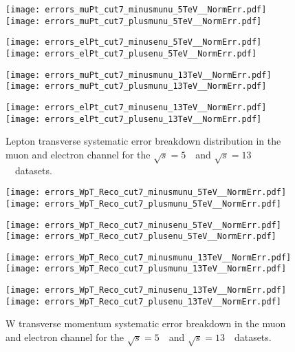 \begin{figure}[h]
	\centering
	{\texttt{[image: errors\_muPt\_cut7\_minusmunu\_5TeV\_\_NormErr.pdf]}\label{f:}}
	{\texttt{[image: errors\_muPt\_cut7\_plusmunu\_5TeV\_\_NormErr.pdf]}\label{f:}}
	
	{\texttt{[image: errors\_elPt\_cut7\_minusenu\_5TeV\_\_NormErr.pdf]}\label{f:}}
	{\texttt{[image: errors\_elPt\_cut7\_plusenu\_5TeV\_\_NormErr.pdf]}\label{f:}}
	
		{\texttt{[image: errors\_muPt\_cut7\_minusmunu\_13TeV\_\_NormErr.pdf]}\label{f:}}
	{\texttt{[image: errors\_muPt\_cut7\_plusmunu\_13TeV\_\_NormErr.pdf]}\label{f:}}
	
	{\texttt{[image: errors\_elPt\_cut7\_minusenu\_13TeV\_\_NormErr.pdf]}\label{f:}}
	{\texttt{[image: errors\_elPt\_cut7\_plusenu\_13TeV\_\_NormErr.pdf]}\label{f:}}
	\caption{  Lepton transverse systematic error breakdown distribution in the muon and electron channel  for the $\sqrt{s} = 5$~\TeV\ and $\sqrt{s} = 13$~\TeV\ datasets.}
\end{figure}
\newpage
\begin{figure}[h]
	\centering
	{\texttt{[image: errors\_WpT\_Reco\_cut7\_minusmunu\_5TeV\_\_NormErr.pdf]}\label{f:}}
	{\texttt{[image: errors\_WpT\_Reco\_cut7\_plusmunu\_5TeV\_\_NormErr.pdf]}\label{f:}}
	
	{\texttt{[image: errors\_WpT\_Reco\_cut7\_minusenu\_5TeV\_\_NormErr.pdf]}\label{f:}}
	{\texttt{[image: errors\_WpT\_Reco\_cut7\_plusenu\_5TeV\_\_NormErr.pdf]}\label{f:}}
	
		{\texttt{[image: errors\_WpT\_Reco\_cut7\_minusmunu\_13TeV\_\_NormErr.pdf]}\label{f:}}
	{\texttt{[image: errors\_WpT\_Reco\_cut7\_plusmunu\_13TeV\_\_NormErr.pdf]}\label{f:}}
	
	{\texttt{[image: errors\_WpT\_Reco\_cut7\_minusenu\_13TeV\_\_NormErr.pdf]}\label{f:}}
	{\texttt{[image: errors\_WpT\_Reco\_cut7\_plusenu\_13TeV\_\_NormErr.pdf]}\label{f:}}
	\caption{  W transverse momentum systematic error breakdown in the muon and electron channel  for the $\sqrt{s} = 5$~\TeV\ and $\sqrt{s} = 13$~\TeV\ datasets.}
\end{figure}
\newpage
\clearpage

